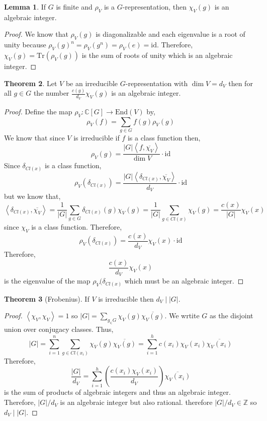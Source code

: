 \documentclass[12pt]{extarticle}
\newcommand{\divides}{\mid}
\newcommand{\Z}{\mathbb{Z}}
\newcommand{\C}{\mathbb{C}}
\newcommand{\End}[1]{\text{End}\left( #1 \right)}
\newcommand{\tr}[1]{\mathrm{Tr} \! \left(#1\right)}
\newcommand{\id}{\mathrm{id}}
\newcommand{\inner}[2]{\left<#1, #2 \right>}
\theoremstyle{definition}
\newtheorem{theorem}{Theorem}[section]
\newtheorem{lemma}[theorem]{Lemma}
\begin{document}
\begin{lemma}
If $G$ is finite and $\rho_V$ is a $G$-representation, then $\chi_V(g)$ is an algebraic integer.
\end{lemma}

\begin{proof}
We know that $\rho_V(g)$ is diagonalizable and each eigenvalue is a root of unity because $\rho_V(g)^n = \rho_V(g^n) = \rho_V(e) = \id$. Therefore, $\chi_V(g) = \tr{\rho_V(g)}$ is the sum of roots of unity which is an algebraic integer.  
\end{proof}

\begin{theorem}
Let $V$ be an irreducible $G$-representation with $\dim{V} = d_V$ then for all $g \in G$ the number $\frac{c(g)}{d_V} \chi_V(g)$ is an algebraic integer.
\end{theorem}

\begin{proof}
Define the map $\rho_V : \C[G] \to \End{V}$ by,
\[ \rho_V(f) = \sum_{g \in G} f(g) \rho_V(g) \]
We know that since $V$ is irreducible if $f$ is a class function then,
\[\rho_V(g) = \frac{|G| \inner{f}{\overline{\chi_V}}}{\dim{V}} \cdot \id\]
Since $\delta_{Cl(x)}$ is a class function,
\[ \rho_V(\delta_{Cl(x)}) = \frac{|G| \inner{\delta_{Cl(x)}}{\overline{\chi_{V}}}}{d_V} \cdot \id \] 
but we know that,
\[ \inner{\delta_{Cl(x)}}{\overline{\chi_V}} = \frac{1}{|G|} \sum_{g \in G} \delta_{Cl(x)}(g) \chi_V(g) = \frac{1}{|G|} \sum_{g \in Cl(x)} \chi_V(g) = \frac{c(x)}{|G|} \chi_V(x)\]
since $\chi_V$ is a class function. 
Therefore,
\[\rho_V(\delta_{Cl(x)}) = \frac{c(x)}{d_V} \chi_V(x) \cdot \id \]
Therefore, 
\[\frac{c(x)}{d_V} \chi_V(x)\]
is the eigenvalue of the map $\rho_V(\delta_{Cl(x)}$ which must be an algebraic integer. 

\end{proof}

\begin{theorem}[Frobenius]
If $V$ is irreducible then $d_V \divides |G|$.
\end{theorem}

\begin{proof}
$\inner{\chi_V}{\chi_V} = 1$ so $|G| = \sum_{g_\in G} \chi_V(g) \overline{\chi_V(g)}$. We wrtite $G$ as the disjoint union over conjugacy classes. Thus,
\[ |G| = \sum_{i = 1}^n \sum_{g \in Cl(x_i)} \chi_V(g) \overline{\chi_V(g)} = \sum_{i = 1}^h c(x_i) \chi_V(x_i) \overline{\chi_V(x_i)} \]
Therefore,
\[ \frac{|G|}{d_V} = \sum_{i = 1}^h \left( \frac{c(x_i) \chi_V(x_i)}{d_V} \right) \overline{\chi_V(x_i)} \]
is the sum of products of algebraic integers and thus an algebraic integer. Therefore, $|G|/d_V$ is an algebraic integer but also rational. therefore $|G|/d_V \in \Z$ so $d_V \divides |G|$. 
\end{proof}
\end{document}
